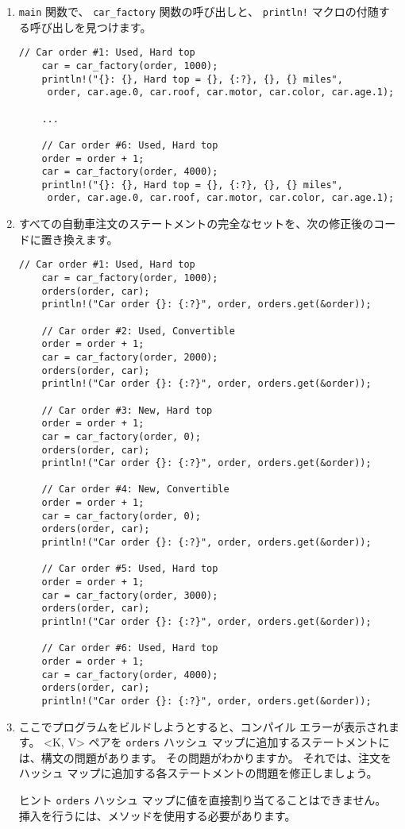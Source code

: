 \begin{enumerate}

\item \texttt{main} 関数で、 \texttt{car\_factory} 関数の呼び出しと、 \texttt{println!} マクロの付随する呼び出しを見つけます。

\begin{lstlisting}[numbers=none]
    // Car order #1: Used, Hard top
    car = car_factory(order, 1000);
    println!("{}: {}, Hard top = {}, {:?}, {}, {} miles",
     order, car.age.0, car.roof, car.motor, car.color, car.age.1);

    ...

    // Car order #6: Used, Hard top
    order = order + 1;
    car = car_factory(order, 4000);
    println!("{}: {}, Hard top = {}, {:?}, {}, {} miles",
     order, car.age.0, car.roof, car.motor, car.color, car.age.1);
\end{lstlisting}

\item すべての自動車注文のステートメントの完全なセットを、次の修正後のコードに置き換えます。

\begin{lstlisting}[numbers=none]
    // Car order #1: Used, Hard top
    car = car_factory(order, 1000);
    orders(order, car);
    println!("Car order {}: {:?}", order, orders.get(&order));

    // Car order #2: Used, Convertible
    order = order + 1;
    car = car_factory(order, 2000);
    orders(order, car);
    println!("Car order {}: {:?}", order, orders.get(&order));

    // Car order #3: New, Hard top
    order = order + 1;
    car = car_factory(order, 0);
    orders(order, car);
    println!("Car order {}: {:?}", order, orders.get(&order));

    // Car order #4: New, Convertible
    order = order + 1;
    car = car_factory(order, 0);
    orders(order, car);
    println!("Car order {}: {:?}", order, orders.get(&order));

    // Car order #5: Used, Hard top
    order = order + 1;
    car = car_factory(order, 3000);
    orders(order, car);
    println!("Car order {}: {:?}", order, orders.get(&order));

    // Car order #6: Used, Hard top
    order = order + 1;
    car = car_factory(order, 4000);
    orders(order, car);
    println!("Car order {}: {:?}", order, orders.get(&order));
\end{lstlisting}

\item ここでプログラムをビルドしようとすると、コンパイル エラーが表示されます。 <K, V> ペアを \texttt{orders} ハッシュ マップに追加するステートメントには、構文の問題があります。 その問題がわかりますか。 それでは、注文をハッシュ マップに追加する各ステートメントの問題を修正しましょう。

\begin{itembox}[l]{ヒント}
\texttt{orders} ハッシュ マップに値を直接割り当てることはできません。 挿入を行うには、メソッドを使用する必要があります。
\end{itembox}


\end{enumerate}

